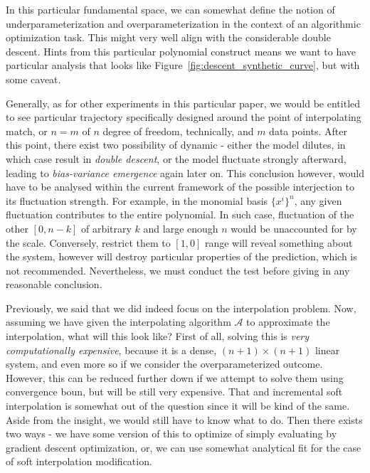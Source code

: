 \documentclass[10pt]{article}
\begin{document}
In this particular fundamental space, we can somewhat define the notion of underparameterization and overparameterization in the context of an algorithmic optimization task. This might very well align with the considerable double descent. Hints from this particular polynomial construct means we want to have particular analysis that looks like Figure~\ref{fig:descent_synthetic_curve}, but with some caveat. 

Generally, as for other experiments in this particular paper, we would be entitled to see particular trajectory specifically designed around the point of interpolating match, or $n=m$ of $n$ degree of freedom, technically, and $m$ data points. After this point, there exist two possibility of dynamic - either the model dilutes, in which case result in \textit{double descent}, or the model fluctuate strongly afterward, leading to \textit{bias-variance emergence} again later on. This conclusion however, would have to be analysed within the current framework of the possible interjection to its fluctuation strength. For example, in the monomial basis $\{x^{i}\}^{n}$, any given fluctuation contributes to the entire polynomial. In such case, fluctuation of the other $[0,n-k]$ of arbitrary $k$ and large enough $n$ would be unaccounted for by the scale. Conversely, restrict them to $[1,0]$ range will reveal something about the system, however will destroy particular properties of the prediction, which is not recommended. Nevertheless, we must conduct the test before giving in any reasonable conclusion.

Previously, we said that we did indeed focus on the interpolation problem. Now, assuming we have given the interpolating algorithm $\mathcal{A}$ to approximate the interpolation, what will this look like? First of all, solving this is \textit{very computationally expensive}, because it is a dense, $(n+1)\times(n+1)$ linear system, and even more so if we consider the overparameterized outcome. However, this can be reduced further down if we attempt to solve them using convergence boun, but will be still very expensive. That and incremental soft interpolation is somewhat out of the question since it will be kind of the same. Aside from the insight, we would still have to know what to do. Then there exists two ways - we have some version of this to optimize of simply evaluating by gradient descent optimization, or, we can use somewhat analytical fit for the case of soft interpolation modification. 
\end{document}
